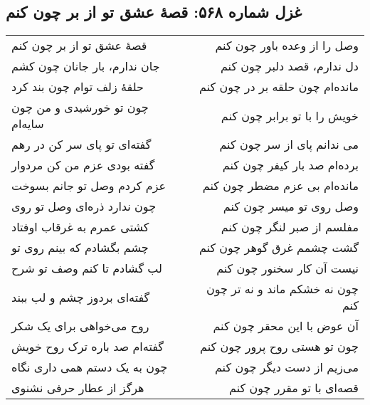 \begin{center}
\section*{غزل شماره ۵۶۸: قصهٔ عشق تو از بر چون کنم}
\label{sec:568}
\begin{longtable}{l p{0.5cm} r}
قصهٔ عشق تو از بر چون کنم
&&
وصل را از وعده باور چون کنم
\\
جان ندارم، بار جانان چون کشم
&&
دل ندارم، قصد دلبر چون کنم
\\
حلقهٔ زلف توام چون بند کرد
&&
مانده‌ام چون حلقه بر در چون کنم
\\
چون تو خورشیدی و من چون سایه‌ام
&&
خویش را با تو برابر چون کنم
\\
گفته‌ای تو پای سر کن در رهم
&&
می ندانم پای از سر چون کنم
\\
گفته بودی عزم من کن مردوار
&&
برده‌ام صد بار کیفر چون کنم
\\
عزم کردم وصل تو جانم بسوخت
&&
مانده‌ام بی عزم مضطر چون کنم
\\
چون ندارد ذره‌ای وصل تو روی
&&
وصل روی تو میسر چون کنم
\\
کشتی عمرم به غرقاب اوفتاد
&&
مفلسم از صبر لنگر چون کنم
\\
چشم بگشادم که بینم روی تو
&&
گشت چشمم غرق گوهر چون کنم
\\
لب گشادم تا کنم وصف تو شرح
&&
نیست آن کار سخنور چون کنم
\\
گفته‌ای بردوز چشم و لب ببند
&&
چون نه خشکم ماند و نه تر چون کنم
\\
روح می‌خواهی برای یک شکر
&&
آن عوض با این محقر چون کنم
\\
گفته‌ام صد باره ترک روح خویش
&&
چون تو هستی روح پرور چون کنم
\\
چون به یک دستم همی داری نگاه
&&
می‌زیم از دست دیگر چون کنم
\\
هرگز از عطار حرفی نشنوی
&&
قصه‌ای با تو مقرر چون کنم
\\
\end{longtable}
\end{center}
